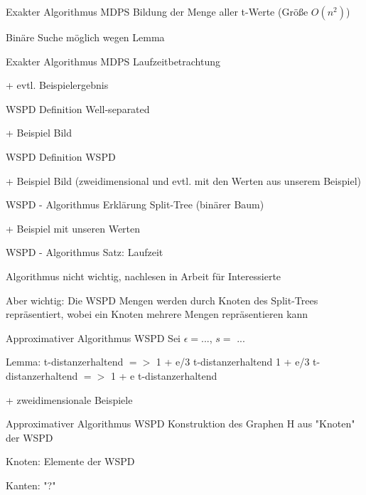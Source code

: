 \documentclass{beamer}
\begin{document}
	\begin{frame}{Exakter Algorithmus MDPS}
		Bildung der Menge aller t-Werte (Größe $O(n^2)$)
		
		Binäre Suche möglich wegen Lemma
		
	\end{frame}
	
	\begin{frame}{Exakter Algorithmus MDPS}
		Laufzeitbetrachtung
		
		+ evtl. Beispielergebnis
	\end{frame}
	
	\begin{frame}{WSPD}
		Definition Well-separated
		
		+ Beispiel Bild
	\end{frame}
	
	\begin{frame}{WSPD}
		Definition WSPD
		
		+ Beispiel Bild (zweidimensional und evtl. mit den Werten aus unserem Beispiel)
	\end{frame}
	
	\begin{frame}{WSPD - Algorithmus}
		Erklärung Split-Tree (binärer Baum)
		
		+ Beispiel mit unseren Werten
	\end{frame}
	
	
	\begin{frame}{WSPD - Algorithmus}
		Satz: Laufzeit
		
		Algorithmus nicht wichtig, nachlesen in Arbeit für Interessierte
		
		Aber wichtig: Die WSPD Mengen werden durch Knoten des Split-Trees repräsentiert, wobei ein Knoten mehrere Mengen repräsentieren kann
	\end{frame}
	
	\begin{frame}{Approximativer Algorithmus WSPD}
		Sei $\epsilon = $..., $s = $ ...
		
		Lemma: 	t-distanzerhaltend $=>$ 1 + e/3 t-distanzerhaltend
				1 + e/3 t-distanzerhaltend $=>$ 1 + e t-distanzerhaltend
				
		+ zweidimensionale Beispiele
	\end{frame}
	
	\begin{frame}{Approximativer Algorithmus WSPD}
		Konstruktion des Graphen H aus "Knoten" der WSPD
		
		Knoten: Elemente der WSPD
		
		Kanten: "?"
	\end{frame}
	
\end{document}
